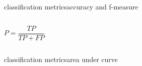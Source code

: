\begin{frame}{classification metrics}{accuracy and f-measure}
\begin{columns}
{\begin{footnotesize}
                        \begin{equation*}
                            P = \frac{TP}{TP + FP} 
                        \end{equation*}
                        \end{footnotesize}
                    }
            \end{columns}
        \end{frame}
        
        \begin{frame}{classification metrics}{area under curve}
        \end{frame}

